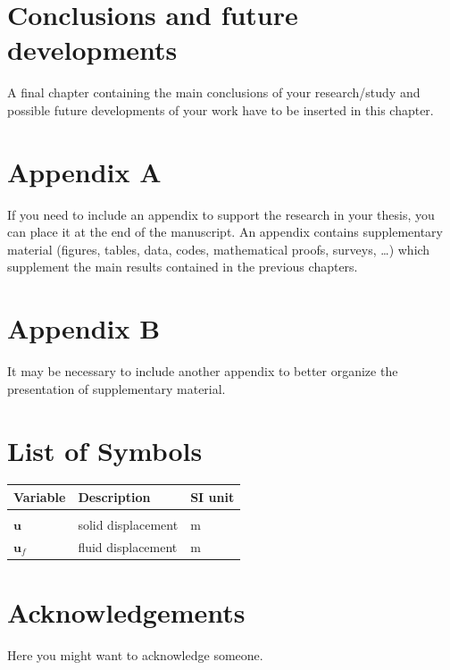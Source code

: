 \documentclass{Configuration_Files/PoliMi3i_thesis}
\begin{document}
\chapter{Conclusions and future developments}
\label{ch:conclusions}
A final chapter containing the main conclusions of your research/study
and possible future developments of your work have to be inserted in this chapter. 




\cleardoublepage
{} %
\appendix
\chapter{Appendix A}
If you need to include an appendix to support the research in your thesis, you can place it at the end of the manuscript.
An appendix contains supplementary material (figures, tables, data, codes, mathematical proofs, surveys, \dots)
which supplement the main results contained in the previous chapters.

\chapter{Appendix B}
It may be necessary to include another appendix to better organize the presentation of supplementary material.


\listoffigures

\listoftables

\chapter*{List of Symbols} %
\begin{table}[H]
    \centering
    \begin{tabular}{lll}
        \textbf{Variable} & \textbf{Description} & \textbf{SI unit} \\\hline\\[-9px]
        $\bm{u}$ & solid displacement & m \\[2px]
        $\bm{u}_f$ & fluid displacement & m \\[2px]
    \end{tabular}
\end{table}

\chapter*{Acknowledgements}
Here you might want to acknowledge someone.

\cleardoublepage
\end{document}
